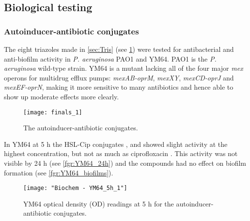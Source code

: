 \subsection{Biological testing\label{sec:bio1}}

\subsubsection{Autoinducer-antibiotic conjugates}

The eight triazoles made in \ref{sec:Tris} (see \ref{fgr:finals_1}) were tested for antibacterial and anti-biofilm activity in \textit{P. aeruginosa} PAO1\cite{Stover2000} and YM64\cite{Morita2001}.
PAO1 is the \textit{P. aeruginosa} wild-type strain.
YM64 is a mutant lacking all of the four major \textit{mex} operons for multidrug efflux pumps: \textit{mexAB-oprM}, \textit{mexXY}, \textit{mexCD-oprJ} and \textit{mexEF-oprN}, making it more sensitive to many antibiotics and hence able to show up moderate effects more clearly.

\begin{figure}[H]
	\begin{center}
		\texttt{[image: finals\_1]}
		\caption{The autoinducer-antibiotic conjugates.
 		\label{fgr:finals_1}}
	\end{center}
\end{figure}


In YM64 at 5 h the HSL-Cip conjugates ,  and  showed slight activity at the highest concentration, but not as much as ciprofloxacin .
This activity was not visible by 24 h (see \ref{fgr:YM64_24h}) and the compounds had no effect on biofilm formation (see \ref{fgr:YM64_biofilms}).



\begin{figure}[H]
	\begin{center}
		\texttt{[image: "Biochem - YM64\_5h\_1"]}
		\caption{YM64 optical density (OD) readings at 5 h for the autoinducer-antibiotic conjugates.\label{fgr:YM64_5h}}
	\end{center}
\end{figure}

